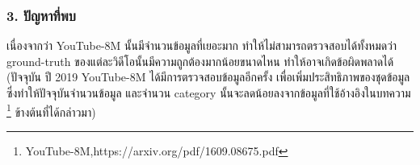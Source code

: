 \subsubsection*{3. ปัญหาที่พบ}
เนื่องจากว่า YouTube-8M นั้นมีจำนวนข้อมูลที่เยอะมาก ทำให้ไม่สามารถตรวจสอบได้ทั้งหมดว่า ground-truth ของแต่ละวิดีโอนั้นมีความถูกต้องมากน้อยขนาดไหน ทำให้อาจเกิดข้อผิดพลาดได้ (ปัจจุบัน ปี 2019 YouTube-8M ได้มีการตรวจสอบข้อมูลอีกครั้ง เพื่อเพิ่มประสิทธิภาพของชุดข้อมูลซึ่งทำให้ปัจจุบันจำนวนข้อมูล และจำนวน category นั้นจะลดน้อยลงจากข้อมูลที่ใช้อ้างอิงในบทความ \footnote{YouTube-8M,https://arxiv.org/pdf/1609.08675.pdf} ข้างต้นที่ได้กล่าวมา)






